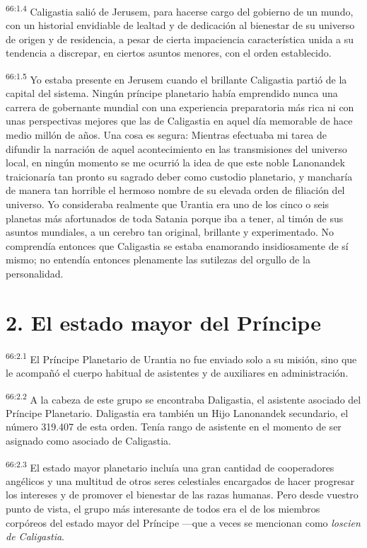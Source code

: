 \par
\textsuperscript{66:1.4} Caligastia salió de Jerusem, para hacerse cargo del gobierno de un mundo, con un historial envidiable de lealtad y de dedicación al bienestar de su universo de origen y de residencia, a pesar de cierta impaciencia característica unida a su tendencia a discrepar, en ciertos asuntos menores, con el orden establecido.

\par
\textsuperscript{66:1.5} Yo estaba presente en Jerusem cuando el brillante Caligastia partió de la capital del sistema. Ningún príncipe planetario había emprendido nunca una carrera de gobernante mundial con una experiencia preparatoria más rica ni con unas perspectivas mejores que las de Caligastia en aquel día memorable de hace medio millón de años. Una cosa es segura: Mientras efectuaba mi tarea de difundir la narración de aquel acontecimiento en las transmisiones del universo local, en ningún momento se me ocurrió la idea de que este noble Lanonandek traicionaría tan pronto su sagrado deber como custodio planetario, y mancharía de manera tan horrible el hermoso nombre de su elevada orden de filiación del universo. Yo consideraba realmente que Urantia era uno de los cinco o seis planetas más afortunados de toda Satania porque iba a tener, al timón de sus asuntos mundiales, a un cerebro tan original, brillante y experimentado. No comprendía entonces que Caligastia se estaba enamorando insidiosamente de sí mismo; no entendía entonces plenamente las sutilezas del orgullo de la personalidad.

\section*{2. El estado mayor del Príncipe}
\par
\textsuperscript{66:2.1} El Príncipe Planetario de Urantia no fue enviado solo a su misión, sino que le acompañó el cuerpo habitual de asistentes y de auxiliares en administración.

\par
\textsuperscript{66:2.2} A la cabeza de este grupo se encontraba Daligastia, el asistente asociado del Príncipe Planetario. Daligastia era también un Hijo Lanonandek secundario, el número 319.407 de esta orden. Tenía rango de asistente en el momento de ser asignado como asociado de Caligastia.

\par
\textsuperscript{66:2.3} El estado mayor planetario incluía una gran cantidad de cooperadores angélicos y una multitud de otros seres celestiales encargados de hacer progresar los intereses y de promover el bienestar de las razas humanas. Pero desde vuestro punto de vista, el grupo más interesante de todos era el de los miembros corpóreos del estado mayor del Príncipe ---que a veces se mencionan como \textit{loscien de Caligastia}.

